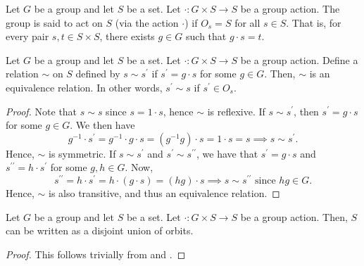 \begin{defn}
    Let $G$ be a group and let $S$ be a set. Let $\cdot \colon G \times S \to S$ be a group action. The group is said to act  on $S$ (via the action $\cdot$) if $O_s = S$ for all $s \in S$. That is, for every pair $s,t \in S \times S$, there exists $g \in G$ such that $g \cdot s = t$. 
\end{defn}

\begin{prop} \label{prop:same-orbit-equivalence}
    Let $G$ be a group and let $S$ be a set. Let $\cdot \colon G \times S \to S$ be a group action. Define a relation $\sim$ on $S$ defined by $s \sim s^{\prime}$ if $s^{\prime} = g \cdot s$ for some $g \in G$. Then, $\sim$ is an equivalence relation. In other words, $s^{\prime} \sim s$ if $s^{\prime} \in O_s$.
\end{prop}
\begin{proof}
    Note that $s \sim s$ since $s = 1 \cdot s$, hence $\sim$ is reflexive. If $s \sim s^{\prime}$, then $s^{\prime} = g \cdot s$ for some $g \in G$. We then have
    \[
        g^{-1} \cdot s^{\prime} = g^{-1} \cdot g \cdot s = (g^{-1}g) \cdot s = 1 \cdot s = s \implies s \sim s^{\prime}.
    \]
    Hence, $\sim$ is symmetric. If $s \sim s^{\prime}$ and $s^{\prime} \sim s^{\prime\prime}$, we have that $s^{\prime} = g \cdot s$ and $s^{\prime\prime} = h \cdot s^{\prime}$ for some $g,h \in G$. Now, 
    \[
        s^{\prime\prime} = h \cdot s^{\prime} = h \cdot (g \cdot s) = (hg) \cdot s \implies s \sim s^{\prime\prime} \text{ since $hg \in G$.}
    \]
    Hence, $\sim$ is also transitive, and thus an equivalence relation.
\end{proof}
\begin{cor}
Let $G$ be a group and let $S$ be a set. Let $\cdot \colon G \times S \to S$ be a group action. Then, $S$ can be written as a disjoint union of orbits.
\end{cor}
\begin{proof}
    This follows trivially from  and .
\end{proof}

